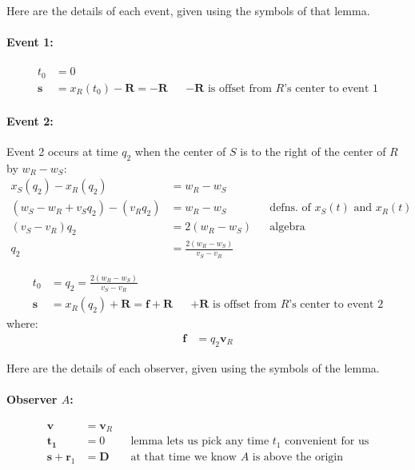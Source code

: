 \documentclass[a4paper]{article}
\theoremstyle{plain}
\theoremstyle{definition}
\newcommand{\vect}[1]{\mathbf{#1}}
\begin{document}
Here are the details of each event, given using the symbols of that
lemma.


\paragraph{Event 1:}

\begin{align}
t_0 & = 0 \\
\vect{s} & = x_R(t_0) - \vect{R} = -\vect{R} & & \text{$-\vect{R}$ is offset from $R$'s center to event 1}
\end{align}


\paragraph{Event 2:}

Event 2 occurs at time $q_2$ when the center of $S$ is to the right of
the center of $R$ by $w_R - w_S$:
\begin{align}
x_S(q_2) - x_R(q_2) & = w_R - w_S \nonumber \\
(w_S - w_R + v_S q_2) - (v_R q_2) & = w_R - w_S & & \text{defns. of $x_S(t)$ and $x_R(t)$} \nonumber \\
(v_S - v_R) q_2 & = 2(w_R - w_S) & & \text{algebra} \nonumber \\
q_2 & = \frac{2(w_R - w_S)}{v_S - v_R} \label{eqn:scen3b-event2time}
\end{align}

\begin{align}
t_0 & = q_2 = \frac{2(w_R - w_S)}{v_S - v_R} \\
\vect{s} & = x_R(q_2) + \vect{R} = \vect{f} + \vect{R} & & \text{$+\vect{R}$ is offset from $R$'s center to event 2}
\end{align}
where:
\begin{align}
\vect{f} & = q_2 \vect{v}_R
\end{align}

Here are the details of each observer, given using the symbols of the
lemma.


\paragraph{Observer $A$:}

\begin{align}
\vect{v} & = \vect{v}_R \\
\vect{t_1} & = 0 & & \text{lemma lets us pick any time $t_1$ convenient for us} \\
\vect{s} + \vect{r}_1 & = \vect{D} & & \text{at that time we know $A$ is above the origin}
\end{align}
\end{document}
